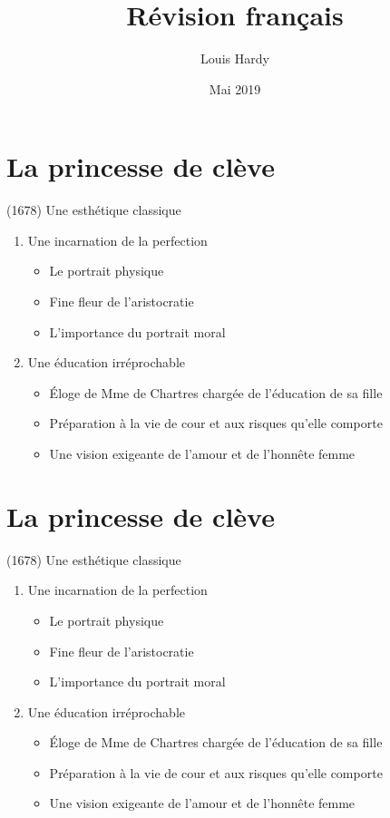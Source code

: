 \documentclass[12pt,a4paper]{article}
\title{Révision français}
\author{Louis Hardy}
\date{Mai 2019}
\begin{document}
\section*{La princesse de clève}
	(1678) Une esthétique classique
\begin{enumerate}
   \item Une incarnation de la perfection
   \begin{itemize}
     \item Le portrait physique
     \item Fine fleur de l'aristocratie
     \item L'importance du portrait moral
   \end{itemize}
   \item Une éducation irréprochable
   \begin{itemize}
       \item Éloge de Mme de Chartres chargée de l'éducation de sa fille
       \item Préparation à la vie de cour et aux risques qu'elle comporte
       \item Une vision exigeante de l'amour et de l'honnête femme
    \end{itemize}
\end{enumerate}
\noindent\hrulefill

\section*{La princesse de clève}
	(1678) Une esthétique classique
\begin{enumerate}
   \item Une incarnation de la perfection
   \begin{itemize}
     \item Le portrait physique
     \item Fine fleur de l'aristocratie
     \item L'importance du portrait moral
   \end{itemize}
   \item Une éducation irréprochable
   \begin{itemize}
       \item Éloge de Mme de Chartres chargée de l'éducation de sa fille
       \item Préparation à la vie de cour et aux risques qu'elle comporte
       \item Une vision exigeante de l'amour et de l'honnête femme
    \end{itemize}
\end{enumerate}
\noindent\hrulefill
\end{document}
